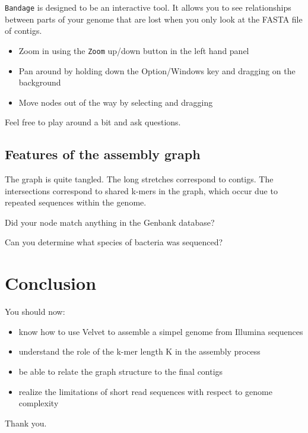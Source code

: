 \texttt{Bandage} is designed to be an interactive tool. It allows you to see relationships between parts of your genome that are lost when you only look at the FASTA file of contigs.
\begin{itemize}
\item Zoom in using the \texttt{Zoom} up/down button in the left hand panel
\item Pan around by holding down the Option/Windows key and dragging on the background
\item Move nodes out of the way by selecting and dragging
\end{itemize}
Feel free to play around a bit and ask questions.

\subsection{Features of the assembly graph}
The graph is quite tangled. The long stretches correspond to contigs. The intersections correspond to shared k-mers in the graph, which occur due to repeated sequences within the genome.

\begin{questions}
Did your node match anything in the Genbank database? \\
\begin{answer}
\end{answer}
Can you determine what species of bacteria was sequenced? \\
\begin{answer}
\end{answer}
\end{questions}

\section{Conclusion}
You should now:
\begin{itemize}
\item know how to use Velvet to assemble a simpel genome from Illumina sequences
\item understand the role of the k-mer length K in the assembly process
\item be able to relate the graph structure to the final contigs
\item realize the limitations of short read sequences with respect to genome complexity
\end{itemize}
Thank you.
